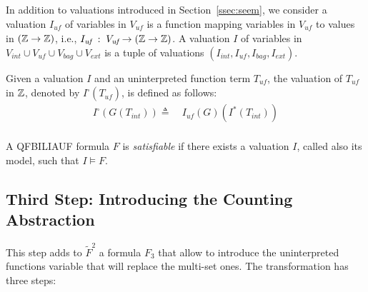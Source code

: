 In addition to valuations introduced in Section~\ref{ssec:seem},
we consider a valuation $I_{\textit{uf}}$ of variables in $V_{\textit{uf}}$ is a function mapping variables in $V_{\textit{uf}}$ to values in $(\mathbb{Z} \rightarrow \mathbb{Z})$, i.e.,
$I_{\textit{uf}} \; : \; V_{\textit{uf}} \rightarrow (\mathbb{Z} \rightarrow \mathbb{Z})$.
A valuation $I$ of variables in $V_{int}\cup V_{\textit{uf}} \cup V_{bag} \cup V_{ext}$ is a tuple of valuations $(I_{int}, I_{\textit{uf}}, I_{bag}, I_{ext})$.

Given a valuation $I$ and an uninterpreted function term $T_{\textit{uf}}$, the valuation of $T_{\textit{uf}}$ in $\mathbb{Z}$,
denoted by $I^{\square}(T_{\textit{uf}})$, is defined as follows:
\begin{align*}
I^{\square}(G(T_{int})) \triangleq&\ I_{\textit{uf}}(G)(I^*(T_{int})) \\
\end{align*}

\begin{mydef}
  A QFBILIAUF formula $F$ is \emph{satisfiable} if there exists a valuation $I$, called also its model, such that $I \models F$.
\end{mydef}

\subsection{Third Step: Introducing the Counting Abstraction}
This step adds to $\tilde{F}^2$ a formula $F_3$ that allow to introduce the uninterpreted functions variable that will replace the multi-set ones. The transformation has three steps:

